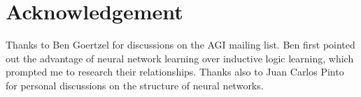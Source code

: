 \documentclass[orivec]{llncs}
\begin{document}
\section*{Acknowledgement}

\footnotesize{Thanks to Ben Goertzel for discussions on the AGI mailing list.  Ben first pointed out the advantage of neural network learning over inductive logic learning, which prompted me to research their relationships.  Thanks also to Juan Carlos Pinto for personal discussions on the structure of neural networks.}

\end{document}
